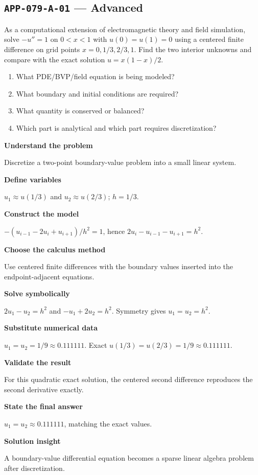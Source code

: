 \documentclass[11pt]{book}
\newcommand{\pid}[1]{\texttt{#1}}
\begin{document}
\subsection*{\pid{APP-079-A-01} — Advanced}
\begin{problembox}
As a computational extension of electromagnetic theory and field simulation, solve $-u''=1$ on $0<x<1$ with $u(0)=u(1)=0$ using a centered finite difference on grid points $x=0,1/3,2/3,1$. Find the two interior unknowns and compare with the exact solution $u=x(1-x)/2$.
\end{problembox}
\begin{promptbox}\begin{enumerate}
\item What PDE/BVP/field equation is being modeled?
\item What boundary and initial conditions are required?
\item What quantity is conserved or balanced?
\item Which part is analytical and which part requires discretization?
\end{enumerate}\end{promptbox}
\begin{solutionbox}
\textbf{Understand the problem}\par Discretize a two-point boundary-value problem into a small linear system.\par\medskip
\textbf{Define variables}\par $u_1\approx u(1/3)$ and $u_2\approx u(2/3)$; $h=1/3$.\par\medskip
\textbf{Construct the model}\par $-(u_{i-1}-2u_i+u_{i+1})/h^2=1$, hence $2u_i-u_{i-1}-u_{i+1}=h^2$.\par\medskip
\textbf{Choose the calculus method}\par Use centered finite differences with the boundary values inserted into the endpoint-adjacent equations.\par\medskip
\textbf{Solve symbolically}\par $2u_1-u_2=h^2$ and $-u_1+2u_2=h^2$. Symmetry gives $u_1=u_2=h^2$.\par\medskip
\textbf{Substitute numerical data}\par $u_1=u_2=1/9\approx 0.111111$. Exact $u(1/3)=u(2/3)=1/9\approx 0.111111$.\par\medskip
\textbf{Validate the result}\par For this quadratic exact solution, the centered second difference reproduces the second derivative exactly.\par\medskip
\textbf{State the final answer}\par $u_1=u_2\approx 0.111111$, matching the exact values.\par\medskip
\textbf{Solution insight}\par A boundary-value differential equation becomes a sparse linear algebra problem after discretization.\par\medskip
\end{solutionbox}
\end{document}
